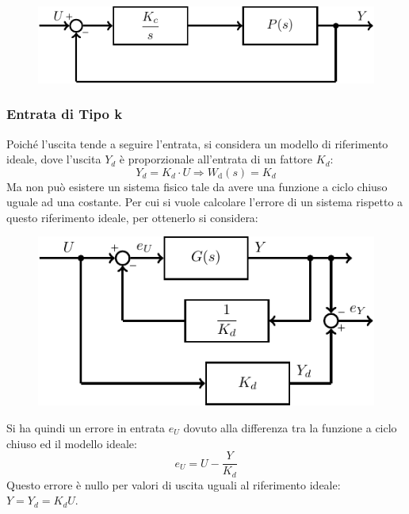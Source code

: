 \documentclass{article}
\numberwithin{equation}{subsection}
\newcommand{\df}{\mathrm{d}}
\begin{document}
\begin{figure}[H]%
    \centering
    \includegraphics{controllore-3.pdf}%
\end{figure}

\subsubsection{Entrata di Tipo k}
\label{sec:entrata-k}
Poiché l'uscita tende a seguire l'entrata, si considera un modello di riferimento ideale, dove l'uscita $Y_d$ è proporzionale all'entrata di un fattore $K_d$:
\begin{equation*}
    Y_d=K_d\cdot U\Rightarrow W_\df(s)=K_d
\end{equation*}
Ma non può esistere un sistema fisico tale da avere una funzione a ciclo chiuso uguale ad una costante. Per cui si vuole calcolare l'errore di un sistema rispetto a 
questo riferimento ideale, per ottenerlo si considera: 

\begin{figure}[H]%
    \centering
    \includegraphics{entrata-k.pdf}%
\end{figure}

Si ha quindi un errore in entrata $e_U$ dovuto alla differenza tra la funzione a ciclo chiuso ed il modello ideale: 
\begin{equation*}
    e_U=U-\displaystyle\frac{Y}{K_d}
\end{equation*}
Questo errore è nullo per valori di uscita uguali al riferimento ideale: $Y=Y_d=K_dU$. 
\end{document}
